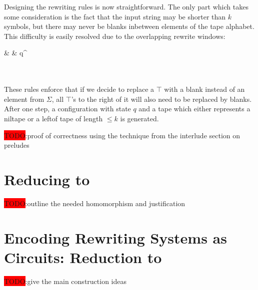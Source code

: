 \documentclass[a4paper,UKenglish,cleveref, autoref]{lipics-v2019}
\newcommand{\TODO}[1]{\colorbox{red}{\LARGE TODO}:#1}
\begin{document}
Designing the rewriting rules is now straightforward. The only part which takes some consideration is the fact that the input string may be shorter than $k$ symbols, but there may never be blanks inbetween elements of the tape alphabet. This difficulty is easily resolved due to the overlapping rewrite windows:
\begin{center}
  \rewwin{\bot & \bot & \bot}{\blank & \blank & \blank}
   {\blank & \blank & q^\blank}
   \\[3ex]
   \\[3ex]
  \rewwin{\top & \top & \top}{\blank & \blank & \blank} \\[3ex]
  \rewwin{\top & \top & \bot}{\blank & \blank & \blank} 
  \rewwin{\top & \bot & \bot}{\blank & \blank & \blank}
\end{center}

These rules enforce that if we decide to replace a $\top$ with a blank instead of an element from $\Sigma$, all $\top$'s to the right of it will also need to be replaced by blanks. After one step, a configuration with state $q$ and a tape which either represents a \textsf{niltape} or a \textsf{leftof} tape of length $\le k$ is generated. 

\TODO{proof of correctness using the technique from the interlude section on preludes}

\section{Reducing \strconrew{} to \binstrconrew{}}
\TODO{outline the needed homomorphism and justification}

\section{Encoding Rewriting Systems as Circuits: Reduction to \csat{}}
\TODO{give the main construction ideas}
\end{document}

